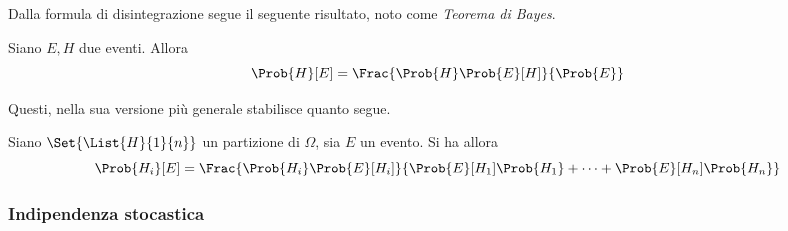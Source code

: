 \documentclass{subfiles}
\begin{document}
Dalla formula di disintegrazione segue il seguente risultato, noto come \emph{Teorema di Bayes}.
\begin{Theorem*}[di Bayes]
    Siano $E, H$ due eventi. Allora
    $$
        \Prob{H}[E] = \Frac{\Prob{H} \Prob{E}[H]}{\Prob{E}}
    $$
\end{Theorem*}
Questi, nella sua versione più generale stabilisce quanto segue.
\begin{Theorem*}
    Siano $\Set{\List{H}{1}{n}}$ un partizione di $\Omega$, sia $E$ un evento.
    Si ha allora
    $$
        \Prob{H_{i}}[E] = \Frac{\Prob{H_{i}} \Prob{E}[H_{i}]}{\Prob{E}[H_{1}] \Prob{H_{1}} + \cdots + \Prob{E}[H_{n}] \Prob{H_{n}}}
    $$
\end{Theorem*}

\subsubsection{Indipendenza stocastica}

\end{document}
